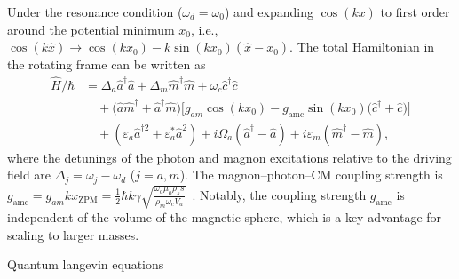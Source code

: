 \documentclass[aps, prresearch, reprint, nofootinbib, longbibliography]{revtex4-2}
\makeatletter
\renewcommand{\thesection}{\Alph{section}}%
\renewcommand{\section}{%
		\secdef{\@Appendix}{\@sAppendix}%
	}%
\newcommand{\@Appendix}[2][?]{%
		\refstepcounter{section}%
		\vspace{0.5em}
		{\centering\large\bfseries Appendix \thesection: #2\par}%
		\addcontentsline{toc}{section}{Appendix \thesection}%
		\markright{Appendix \thesection}%
	}%
\makeatother
\begin{document}
Under the resonance condition ($\omega_d = \omega_0$) and expanding $\cos(kx)$ to first order around the potential minimum $x_0$, i.e., $\cos(k\hat{x})\rightarrow\cos(kx_0)-k\sin(kx_0)(\hat{x}-x_0)$. The total Hamiltonian in the rotating frame can be written as\begin{align}
\hat{H}/\hbar
&= \Delta_a \hat{a}^\dagger \hat{a}
+ \Delta_m \hat{m}^\dagger \hat{m}
+ \omega_c \hat{c}^\dagger \hat{c} \nonumber \\
&\quad+ \bigl( \hat{a}\hat{m}^\dagger + \hat{a}^\dagger \hat{m} \bigr)
\bigl[ g_{am} \cos(kx_0) - g_\text{amc} \sin(kx_0)
\bigl( \hat{c}^\dagger + \hat{c} \bigr) \bigr] \nonumber \\
&\quad+ \left( {\varepsilon_{a}}\hat{a}^{\dagger 2} + {\varepsilon^*_{a}}\hat{a}^2  \right)
+ i\Omega_a \left( \hat{a}^{\dagger} - \hat{a} \right)
+ i\varepsilon_m \left( \hat{m}^{\dagger} - \hat{m} \right),
\label{eq:H_rotating}
\end{align}
where the detunings of the photon and magnon excitations relative to the driving field are $\Delta_j = \omega_j - \omega_d$ ($j = a, m$). The magnon--photon--CM coupling strength is
$g_{\mathrm{amc}} = g_{am} k x_{\scriptscriptstyle{\mathrm{ZPM}}}
= \frac{1}{2} \hbar k \gamma \sqrt{\frac{\omega_a \mu_0 \rho_s s}{\rho_m \omega_c V_a}}
\label{eq:g_amc}
$~\cite{PhysRevLett.113.156401}.
Notably, the coupling strength $g_{\text{amc}}$ is independent of the volume of the magnetic sphere, which is a key advantage for scaling to larger masses.




\section{Quantum langevin equations} \label{III}
\end{document}
